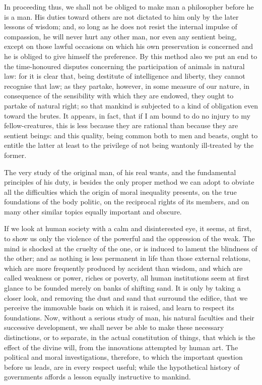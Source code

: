 \documentclass[12pt]{report}
\begin{document}
In proceeding thus, we shall not be obliged to make man a philosopher before he is a man. His duties toward others are not dictated to him only by the later lessons of wisdom; and, so long as he does not resist the internal impulse of compassion, he will never hurt any other man, nor even any sentient being, except on those lawful occasions on which his own preservation is concerned and he is obliged to give himself the preference. By this method also we put an end to the time-honoured disputes concerning the participation of animals in natural law: for it is clear that, being destitute of intelligence and liberty, they cannot recognise that law; as they partake, however, in some measure of our nature, in consequence of the sensibility with which they are endowed, they ought to partake of natural right; so that mankind is subjected to a kind of obligation even toward the brutes. It appears, in fact, that if I am bound to do no injury to my fellow-creatures, this is less because they are rational than because they are sentient beings: and this quality, being common both to men and beasts, ought to entitle the latter at least to the privilege of not being wantonly ill-treated by the former.

The very study of the original man, of his real wants, and the fundamental principles of his duty, is besides the only proper method we can adopt to obviate all the difficulties which the origin of moral inequality presents, on the true foundations of the body politic, on the reciprocal rights of its members, and on many other similar topics equally important and obscure.

If we look at human society with a calm and disinterested eye, it seems, at first, to show us only the violence of the powerful and the oppression of the weak. The mind is shocked at the cruelty of the one, or is induced to lament the blindness of the other; and as nothing is less permanent in life than those external relations, which are more frequently produced by accident than wisdom, and which are called weakness or power, riches or poverty, all human institutions seem at first glance to be founded merely on banks of shifting sand. It is only by taking a closer look, and removing the dust and sand that surround the edifice, that we perceive the immovable basis on which it is raised, and learn to respect its foundations. Now, without a serious study of man, his natural faculties and their successive development, we shall never be able to make these necessary distinctions, or to separate, in the actual constitution of things, that which is the effect of the divine will, from the innovations attempted by human art. The political and moral investigations, therefore, to which the important question before us leads, are in every respect useful; while the hypothetical history of governments affords a lesson equally instructive to mankind.
\end{document}
